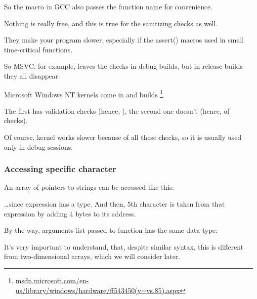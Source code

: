 So the macro in GCC also passes the function name for convenience.

Nothing is really free, and this is true for the sanitizing checks as well.

They make your program slower, especially if the assert() macros used in small time-critical functions.

So MSVC, for example, leaves the checks in debug builds, but in release builds they all disappear.
 
Microsoft \gls{Windows NT} kernels come in  and  builds
\footnote{\href{http://go.yurichev.com/17259}{msdn.microsoft.com/en-us/library/windows/hardware/ff543450(v=vs.85).aspx}}.

The first has validation checks (hence, ), the second one doesn't (hence,  of checks).

Of course,  kernel works slower because of all these checks, so it is usually used only in debug sessions.


\subsubsection{Accessing specific character}

An array of pointers to strings can be accessed like this:



\dots since  expression has a  type.
And then, 5th character is taken from that expression by adding 4 bytes to its address.

By the way, arguments list passed to  function has the same data type:



It's very important to understand, that, despite similar syntax,
this is different from two-dimensional arrays, which we will consider later.

